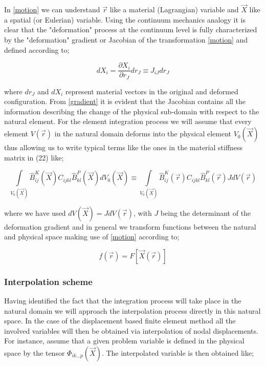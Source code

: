 

In \eqref{motion} we can understand $\vec{r}$ like a material (Lagrangian) variable and $\vec{X}$ like a spatial (or Eulerian) variable. Using the continuum mechanics analogy it is clear that the "deformation" process at the continuum level is fully characterized by the "deformation" gradient or Jacobian of the transformation \eqref{motion} and defined according to;

\begin{equation}
dX_i=\dfrac{\partial X_i}{\partial r_J}dr_J\equiv J_{iJ}dr_J
\label{gradient}
\end{equation}

where $dr_J$ and $dX_i$ represent material vectors in the original and deformed configuration. From \eqref{gradient} it is evident that the Jacobian contains all the information describing the change of the physical sub-domain with respect to the natural element. For the element integration process we will assume that every element $V(\vec{r})$ in the natural domain deforms into the physical element $V_0(\vec{X})$ thus allowing us to write typical terms like the ones in the material stiffness matrix in (22) like;

\begin{equation}
\int\limits_{V_0(\vec{X})} \hat{B}_{ij}^K(\vec{X}) C_{ijkl} \hat{B}_{kl}^P(\vec{X}) dV_0(\vec{X})\equiv \int\limits_{V_0(\vec{X})} \hat{B}_{ij}^K(\vec{r}) C_{ijkl} \hat{B}_{kl}^P(\vec{r})J dV(\vec{r})
\label{matmatrix}
\end{equation}


where we have used $dV(\vec{X})=JdV(\vec{r})$, with $J$ being the determinant of the deformation gradient and in general we transform functions between the natural and physical space making use of \eqref{motion} according to;

\begin{equation}
f(\vec{r})=F[\vec{X}(\vec{r})]
\label{funtrans}
\end{equation}

	 								
\subsubsection{Interpolation scheme}
Having identified the fact that the integration process will take place in the natural domain we will approach the interpolation process directly in this natural space.  In the case of the displacement based finite element method all the involved variables will then be obtained via interpolation of nodal displacements.  For instance, assume that a given problem variable is defined in the physical space by the tensor $\Phi_{ik...p}(\vec{X})$. The interpolated variable is then obtained like;

